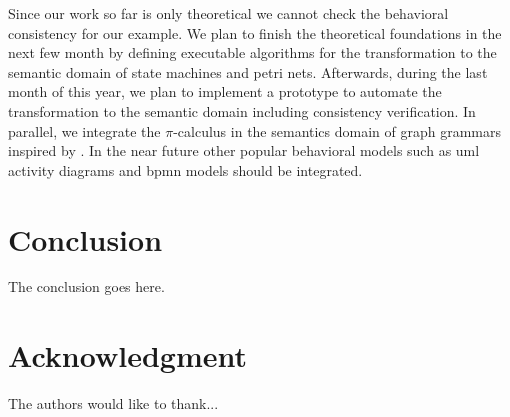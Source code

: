 \documentclass[conference]{IEEEtran}
\begin{document}
Since our work so far is only theoretical we cannot check the behavioral consistency for our example.
We plan to finish the theoretical foundations in the next few month by defining executable algorithms for the transformation to the semantic domain of state machines and petri nets.
Afterwards, during the last month of this year, we plan to implement a prototype to automate the transformation to the semantic domain including consistency verification.
In parallel, we integrate the $\pi$-calculus in the semantics domain of graph grammars inspired by \cite{gadducciGraphRewritingPcalculus2007}.
In the near future other popular behavioral models such as \gls{uml} activity diagrams and \gls{bpmn} models should be integrated. 


\section{Conclusion}

The conclusion goes here.

\section*{Acknowledgment}
The authors would like to thank...



\end{document}
